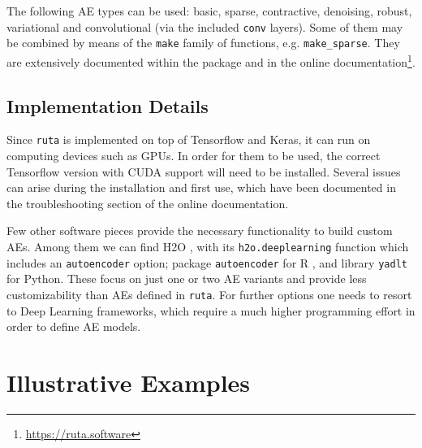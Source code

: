 The following AE types can be used: basic, sparse, contractive, denoising, robust, variational {and convolutional (via the included \texttt{conv} layers)}. Some of them may be combined by means of the \texttt{make} family of functions, e.g. \texttt{make\_sparse}. They are extensively documented within the package and in the online documentation\footnote{\url{https://ruta.software}}.


\subsection{Implementation Details}
\label{p2sec.implementation}

Since \texttt{ruta} is implemented on top of Tensorflow and Keras, it can run on computing devices such as GPUs. In order for them to be used, the correct Tensorflow version with CUDA support will need to be installed. Several issues can arise during the installation and first use, which have been documented in the troubleshooting section of the online documentation.

Few other software pieces provide the necessary functionality to build custom AEs. Among them we can find H2O , with its \texttt{h2o.deeplearning} function which includes an \texttt{autoencoder} option; package \texttt{autoencoder} for R , and library \texttt{yadlt} for Python. These focus on just one or two AE variants and provide less customizability than AEs defined in \texttt{ruta}. For further options one needs to resort to Deep Learning frameworks, which require a much higher programming effort in order to define AE models.


\section{Illustrative Examples}
\label{p2sec.examples}


